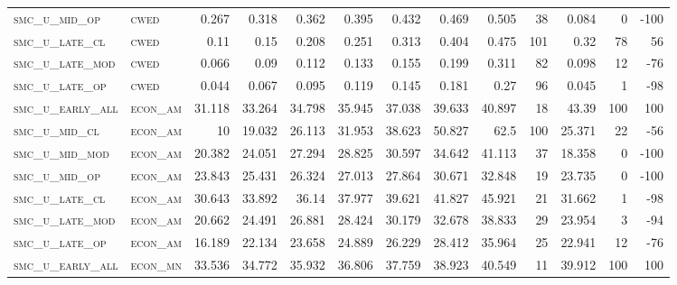 \begin{landscape}
\begin{center}
\begin{footnotesize}
\begin{longtable}{llrrrrrrrr|rrr}
\textsc{smc\_u\_mid\_op   } & \textsc{cwed      }   & 0.267    & 0.318    & 0.362    & 0.395    & 0.432    & 0.469    & 0.505     & 38     & 0.084         & 0             & -100            \\
\textsc{smc\_u\_late\_cl  } & \textsc{cwed      }   & 0.11     & 0.15     & 0.208    & 0.251    & 0.313    & 0.404    & 0.475     & 101    & 0.32          & 78            & 56              \\
\textsc{smc\_u\_late\_mod } & \textsc{cwed      }   & 0.066    & 0.09     & 0.112    & 0.133    & 0.155    & 0.199    & 0.311     & 82     & 0.098         & 12            & -76             \\
\textsc{smc\_u\_late\_op  } & \textsc{cwed      }   & 0.044    & 0.067    & 0.095    & 0.119    & 0.145    & 0.181    & 0.27      & 96     & 0.045         & 1             & -98             \\
\textsc{smc\_u\_early\_all} & \textsc{econ\_am  }   & 31.118   & 33.264   & 34.798   & 35.945   & 37.038   & 39.633   & 40.897    & 18     & 43.39         & 100           & 100             \\
\textsc{smc\_u\_mid\_cl   } & \textsc{econ\_am  }   & 10       & 19.032   & 26.113   & 31.953   & 38.623   & 50.827   & 62.5      & 100    & 25.371        & 22            & -56             \\
\textsc{smc\_u\_mid\_mod  } & \textsc{econ\_am  }   & 20.382   & 24.051   & 27.294   & 28.825   & 30.597   & 34.642   & 41.113    & 37     & 18.358        & 0             & -100            \\
\textsc{smc\_u\_mid\_op   } & \textsc{econ\_am  }   & 23.843   & 25.431   & 26.324   & 27.013   & 27.864   & 30.671   & 32.848    & 19     & 23.735        & 0             & -100            \\
\textsc{smc\_u\_late\_cl  } & \textsc{econ\_am  }   & 30.643   & 33.892   & 36.14    & 37.977   & 39.621   & 41.827   & 45.921    & 21     & 31.662        & 1             & -98             \\
\textsc{smc\_u\_late\_mod } & \textsc{econ\_am  }   & 20.662   & 24.491   & 26.881   & 28.424   & 30.179   & 32.678   & 38.833    & 29     & 23.954        & 3             & -94             \\
\textsc{smc\_u\_late\_op  } & \textsc{econ\_am  }   & 16.189   & 22.134   & 23.658   & 24.889   & 26.229   & 28.412   & 35.964    & 25     & 22.941        & 12            & -76             \\
\textsc{smc\_u\_early\_all} & \textsc{econ\_mn  }   & 33.536   & 34.772   & 35.932   & 36.806   & 37.759   & 38.923   & 40.549    & 11     & 39.912        & 100           & 100             \\

\end{longtable}
\end{footnotesize}
\end{center}
\end{landscape}
